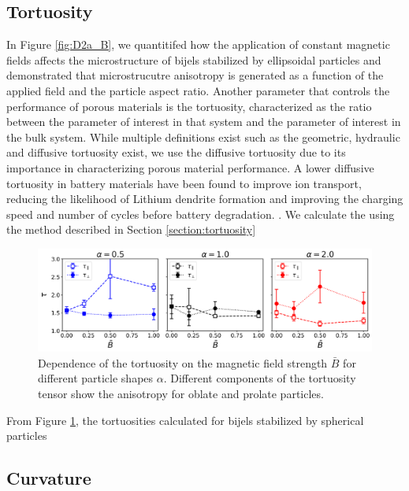 \subsection{Tortuosity}

In Figure \ref{fig:D2a_B}, we quantitifed how the application of constant magnetic fields affects the microstructure of bijels stabilized by ellipsoidal particles
and demonstrated that microstrucutre anisotropy is generated as a function of the applied field and the particle aspect ratio. Another parameter that controls the
performance of porous materials is the tortuosity, characterized as the ratio between the parameter of interest in that system and the parameter of interest in
the bulk system. While multiple definitions exist such as the geometric, hydraulic and diffusive tortuosity exist, we use the diffusive tortuosity due to its
importance in characterizing porous material performance. A lower diffusive tortuosity in battery materials have been found to improve ion transport, reducing the
likelihood of Lithium dendrite formation and improving the charging speed and number of cycles before battery degradation. 
\cite{chen_tortuosity_2020, ebner_tortuosity_2014}. We calculate the using the method described in Section \ref{section:tortuosity}


\begin{figure}
    \centering
    \includegraphics[scale = 0.4]{figures/results/paper1/tortuosity_compare.png}
    \caption{Dependence of the tortuosity on the magnetic field strength $\bar{B}$ for different particle shapes $\alpha$. 
             Different components of the tortuosity tensor show the anisotropy for oblate and prolate particles.}
    \label{fig:tau_B}
\end{figure}

From Figure \ref{fig:tau_B}, the tortuosities calculated for bijels stabilized by spherical particles 

\subsection{Curvature}

